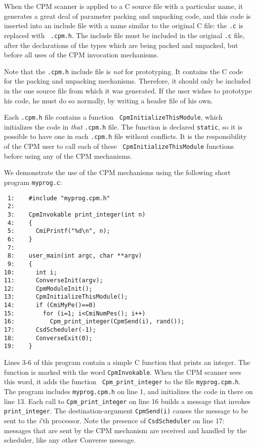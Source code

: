 When the CPM scanner is applied to a C source file with a particular
name, it generates a great deal of parameter packing and unpacking
code, and this code is inserted into an include file with a name
similar to the original C file: the {\tt .c} is replaced with {\tt
.cpm.h}.  The include file must be included in the original {\tt .c}
file, after the declarations of the types which are being packed and
unpacked, but before all uses of the CPM invocation mechanisms.

Note that the {\tt .cpm.h} include file is {\em not} for prototyping.
It contains the C code for the packing and unpacking mechanisms.
Therefore, it should only be included in the one source file from
which it was generated.  If the user wishes to prototype his code, he
must do so normally, by writing a header file of his own.

Each {\tt .cpm.h} file contains a function {\tt
CpmInitializeThisModule}, which initializes the code in {\it that}
{\tt .cpm.h} file.  The function is declared {\tt static}, so it is
possible to have one in each {\tt .cpm.h} file without conflicts.  It
is the responsibility of the CPM user to call each of these {\tt
CpmInitializeThisModule} functions before using any of the CPM
mechanisms.


We demonstrate the use of the CPM mechanisms using the following
short program {\tt myprog.c}:

\begin{verbatim}
 1:    #include "myprog.cpm.h"
 2:   
 3:    CpmInvokable print_integer(int n)
 4:    {
 5:      CmiPrintf("%d\n", n);
 6:    }
 7:    
 8:    user_main(int argc, char **argv)
 9:    {
10:      int i;
11:      ConverseInit(argv);
12:      CpmModuleInit();
13:      CpmInitializeThisModule();
14:      if (CmiMyPe()==0)
15:        for (i=1; i<CmiNumPes(); i++)
16:          Cpm_print_integer(CpmSend(i), rand());
17:      CsdScheduler(-1);
18:      ConverseExit(0);
19:    }
\end{verbatim}

Lines 3-6 of this program contain a simple C function that prints an
integer.  The function is marked with the word {\tt CpmInvokable}.
When the CPM scanner sees this word, it adds the function {\tt
Cpm\_print\_integer} to the file {\tt myprog.cpm.h}.  The program
includes {\tt myprog.cpm.h} on line 1, and initializes the code in
there on line 13.  Each call to {\tt Cpm\_print\_integer} on line 16
builds a message that invokes {\tt print\_integer}.  The
destination-argument {\tt CpmSend(i)} causes the message to be sent to
the {\it i}'th processor.  Note the presence of {\tt CsdScheduler} on
line 17: messages that are sent by the CPM mechanism are received and
handled by the scheduler, like any other Converse message.

